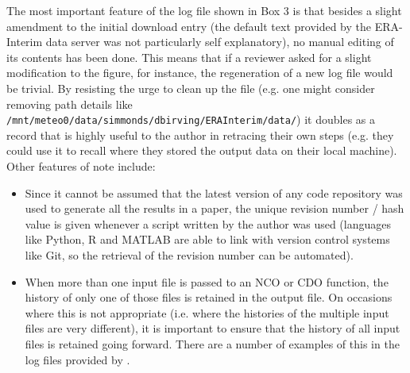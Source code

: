 The most important feature of the log file shown in Box 3 is that besides a slight amendment to the initial download entry (the default text provided by the ERA-Interim data server was not particularly self explanatory), no manual editing of its contents has been done. This means that if a reviewer asked for a slight modification to the figure, for instance, the regeneration of a new log file would be trivial. By resisting the urge to clean up the file (e.g. one might consider removing path details like \verb|/mnt/meteo0/data/simmonds/dbirving/ERAInterim/data/|) it doubles as a record that is highly useful to the author in retracing their own steps (e.g. they could use it to recall where they stored the output data on their local machine). Other features of note include:
\begin{itemize}
\item Since it cannot be assumed that the latest version of any code repository was used to generate all the results in a paper, the unique revision number / hash value is given whenever a script written by the author was used (languages like Python, R and MATLAB are able to link with version control systems like Git, so the retrieval of the revision number can be automated).
\item When more than one input file is passed to an NCO or CDO function, the history of only one of those files is retained in the output file. On occasions where this is not appropriate (i.e. where the histories of the multiple input files are very different), it is important to ensure that the history of all input files is retained going forward. There are a number of examples of this in the log files provided by \citet{Irving2015}. 
\end{itemize}
